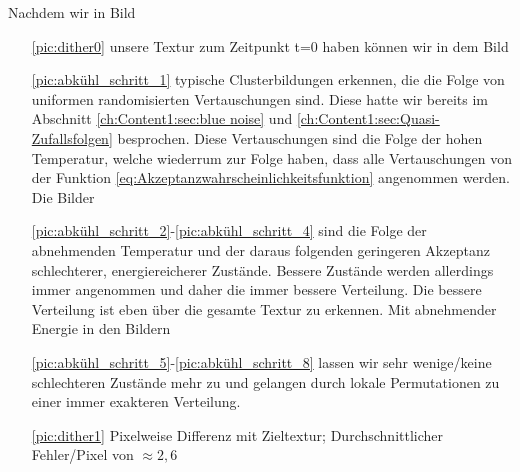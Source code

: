   Nachdem wir in Bild 
  \begin{itemize}
    \item[\ref{pic:dither0}] unsere  Textur zum Zeitpunkt t=0 
                              haben können wir in dem Bild
    \item[\ref{pic:abkühl_schritt_1}] typische Clusterbildungen erkennen, die die Folge von 
                                    uniformen randomisierten Vertauschungen sind. Diese hatte wir bereits 
                                    im Abschnitt \ref{ch:Content1:sec:blue noise} und \ref{ch:Content1:sec:Quasi-Zufallsfolgen}
                                    besprochen. Diese Vertauschungen sind die Folge der hohen Temperatur, welche wiederrum zur Folge haben, 
                                    dass alle Vertauschungen von der Funktion \ref{eq:Akzeptanzwahrscheinlichkeitsfunktion} angenommen werden. 
                                    Die Bilder  
    \item[\ref{pic:abkühl_schritt_2}-\ref{pic:abkühl_schritt_4}] sind die Folge der abnehmenden Temperatur und der daraus folgenden geringeren 
                                    Akzeptanz schlechterer, energiereicherer Zustände. Bessere Zustände werden allerdings immer angenommen und 
                                    daher die immer bessere  Verteilung. Die bessere Verteilung ist eben über 
                                    die gesamte Textur zu erkennen. Mit abnehmender Energie in den Bildern   
    \item[\ref{pic:abkühl_schritt_5}-\ref{pic:abkühl_schritt_8}] lassen wir sehr wenige/keine schlechteren Zustände mehr zu und gelangen durch 
                                    lokale Permutationen zu einer immer exakteren Verteilung.  
    \item[\ref{pic:dither1}] Pixelweise Differenz mit Zieltextur; Durchschnittlicher Fehler/Pixel von $\approx 2,6$ 
  \end{itemize}





